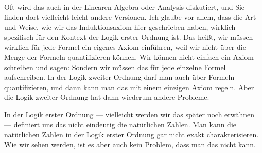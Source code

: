\begin{spoken-clean}[00:15:10 - 00:16:30]
Oft wird das auch in der Linearen Algebra oder Analysis diskutiert, und Sie finden dort vielleicht leicht andere Versionen. Ich glaube vor allem, dass die Art und Weise, wie wir das Induktionsaxiom hier geschrieben haben, wirklich spezifisch für den Kontext der Logik erster Ordnung ist. Das heißt, wir müssen wirklich für jede Formel ein eigenes Axiom einführen, weil wir nicht über die Menge der Formeln quantifizieren können. Wir können nicht einfach ein Axiom schreiben und sagen:  Sondern wir müssen das für jede einzelne Formel aufschreiben. In der Logik zweiter Ordnung darf man auch über Formeln quantifizieren, und dann kann man das mit einem einzigen Axiom regeln. Aber die Logik zweiter Ordnung hat dann wiederum andere Probleme.

In der Logik erster Ordnung --- vielleicht werden wir das später noch erwähnen --- definiert uns das nicht eindeutig die natürlichen Zahlen. Man kann die natürlichen Zahlen in der Logik erster Ordnung gar nicht exakt charakterisieren. Wie wir sehen werden, ist es aber auch kein Problem, dass man das nicht kann.
\end{spoken-clean}

